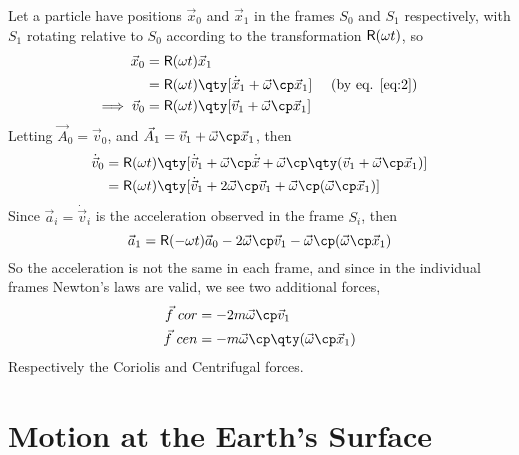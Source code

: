 Let a particle have positions $\vec{x}_0$ and $\vec{x}_1$ in the
frames $S_0$ and $S_1$ respectively, with $S_1$ rotating relative to
$S_0$ according to the transformation $\mathsf{R}(\omega t)$, so
\begin{align*}
  \vec{x}_0 &= \mat{R}(\omega t) \vec{x}_1 \\
&= \mat{R}(\omega t) \qty[ \dot{\vec{x}}_1 + \vec{\omega} \cp \vec{x}_1 ] &\omit\hfill \text{ (by eq. \eqref{eq:2})} \\
\implies \vec{v}_0 &= \mat{R}(\omega t) \qty[ \vec{v}_1 + \vec{\omega} \cp \vec{x}_1 ]
\end{align*}
Letting $\vec{A}_0 = \vec{v}_0$, and $\vec{A}_1 = \vec{v}_1 + \vec{\omega} \cp \vec{x}_1$, then
\begin{align*}
  \dot{\vec{v}}_0 &= \mat{R}(\omega t) \qty[ \dot{\vec{v}}_1 + \vec{\omega} \cp \dot{\vec{x}} + \vec{\omega} \cp \qty( \vec{v}_1 + \vec{\omega} \cp \vec{x}_1 ) ] \\ 
&= \mat{R}(\omega t) \qty[ \dot{\vec{v}}_1 + 2 \vec{\omega} \cp \vec{v}_1 + \vec{\omega} \cp ( \vec{\omega} \cp \vec{x}_1 )]
\end{align*}
Since $\vec{a}_i = \dot{\vec{v}}_i$ is the acceleration observed in
the frame $S_i$, then
\[ \vec{a}_1 = \mat{R}(-\omega t) \vec{a}_0 - 2 \vec{\omega} \cp
\vec{v}_1 - \vec{\omega} \cp ( \vec{\omega} \cp \vec{x}_1 ) \] So the
acceleration is not the same in each frame, and since in the
individual frames Newton's laws are valid, we see two additional
forces,
\begin{subequations}
\begin{align}
  \label{eq:3}
  \vec{f}~{cor} &= - 2 m \vec{\omega} \cp \vec{v}_1 \\
\vec{f}~{cen} &= - m \vec{\omega} \cp \qty( \vec{\omega} \cp \vec{x}_1 )
\end{align}
\end{subequations}
Respectively the Coriolis and Centrifugal forces.

\section{Motion at the Earth's Surface}
\label{sec:motion-at-earths}


